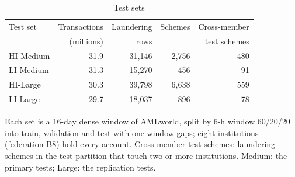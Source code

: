 \begin{table}[!t]
\centering
\caption{Test sets}
\label{tab:datasets}
\footnotesize
\setlength{\tabcolsep}{4pt}
\begin{tabular}{lrrrr}
\hline
Test set & Transactions & Laundering & Schemes & Cross-member \\
 & (millions) & rows & & test schemes \\
\hline
HI-Medium & 31.9 & 31,146 & 2,756 & 480 \\
LI-Medium & 31.3 & 15,270 & 456 & 91 \\
HI-Large & 30.3 & 39,798 & 6,638 & 559 \\
LI-Large & 29.7 & 18,037 & 896 & 78 \\
\hline
\end{tabular}
\par\smallskip\parbox{\linewidth}{\scriptsize Each set is a 16-day dense window of AMLworld, split by 6-h window 60/20/20 into train, validation and test with one-window gaps; eight institutions (federation B8) hold every account. Cross-member test schemes: laundering schemes in the test partition that touch two or more institutions. Medium: the primary tests; Large: the replication tests.}
\end{table}
